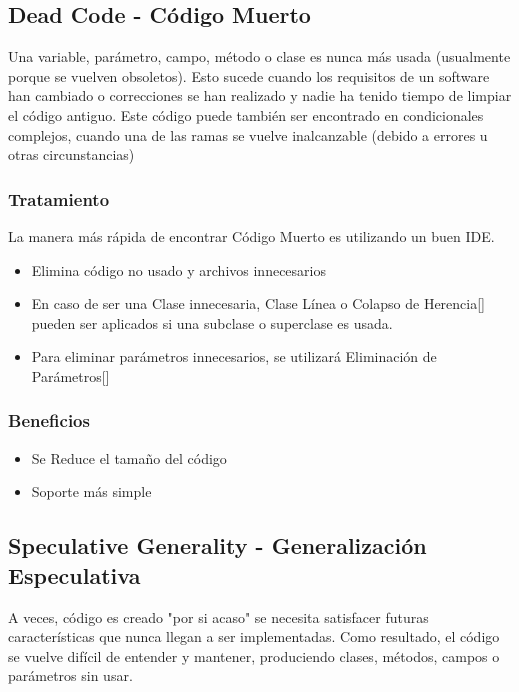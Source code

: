 \documentclass[11pt,a4paper,oneside]{book}
\begin{document}
\subsection{Dead Code - Código Muerto}
\label{deadcode}
Una variable, parámetro, campo, método o clase es nunca más usada (usualmente porque se vuelven obsoletos). Esto sucede cuando los requisitos de un software han cambiado o correcciones se han realizado y nadie ha tenido tiempo de limpiar el código antiguo.
Este código puede también ser encontrado en condicionales complejos, cuando una de las ramas se vuelve inalcanzable (debido a errores u otras circunstancias)
\subsubsection{Tratamiento}

La manera más rápida de encontrar Código Muerto es utilizando un buen IDE.
\begin{itemize}
    \item Elimina código no usado y archivos innecesarios
    \item En caso de ser una Clase innecesaria, Clase Línea o Colapso de Herencia[\pageref{colapsehierarchy}] pueden ser aplicados si una subclase o superclase es usada.
    \item Para eliminar parámetros innecesarios, se utilizará Eliminación de Parámetros[\pageref{removeparameter}]
\end{itemize}

\subsubsection{Beneficios}
\begin{itemize}
    \item Se Reduce el tamaño del código
    \item Soporte más simple
\end{itemize}

\subsection{Speculative Generality - Generalización Especulativa}
\label{speculativeGenerality}
A veces, código es creado "por si acaso" se necesita satisfacer futuras características que nunca llegan a ser implementadas. Como resultado, el código se vuelve difícil de entender y mantener, produciendo clases, métodos, campos o parámetros sin usar.
\end{document}
